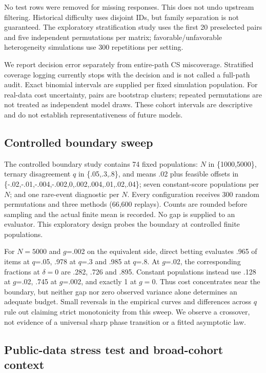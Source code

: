 No test rows were removed for missing responses. This does not undo upstream filtering. Historical difficulty uses disjoint IDs, but family separation is not guaranteed. The exploratory stratification study uses the first 20 preselected pairs and five independent permutations per matrix; favorable/unfavorable heterogeneity simulations use 300 repetitions per setting.

We report decision error separately from entire-path CS miscoverage. Stratified coverage logging currently stops with the decision and is not called a full-path audit. Exact binomial intervals are supplied per fixed simulation population. For real-data cost uncertainty, pairs are bootstrap clusters; repeated permutations are not treated as independent model draws. These cohort intervals are descriptive and do not establish representativeness of future models.

\subsection{Controlled boundary sweep}\label{controlled-boundary-sweep}

The controlled boundary study contains 74 fixed populations: \(N\) in \{1000,5000\}, ternary disagreement \(q\) in \{.05,.3,.8\}, and means .02 plus feasible offsets in \{-.02,-.01,-.004,-.002,0,.002,.004,.01,.02,.04\}; seven constant-score populations per \(N\); and one rare-event diagnostic per \(N\). Every configuration receives 300 random permutations and three methods (66,600 replays). Counts are rounded before sampling and the actual finite mean is recorded. No gap is supplied to an evaluator. This exploratory design probes the boundary at controlled finite populations.

For \(N=5000\) and \(g\)=.002 on the equivalent side, direct betting evaluates .965 of items at \(q\)=.05, .978 at \(q\)=.3 and .985 at \(q\)=.8. At \(g\)=.02, the corresponding fractions at \(\delta=0\) are .282, .726 and .895. Constant populations instead use .128 at \(g\)=.02, .745 at \(g\)=.002, and exactly 1 at \(g=0\). Thus cost concentrates near the boundary, but neither gap nor zero observed variance alone determines an adequate budget. Small reversals in the empirical curves and differences across \(q\) rule out claiming strict monotonicity from this sweep. We observe a crossover, not evidence of a universal sharp phase transition or a fitted asymptotic law.

\subsection{Public-data stress test and broad-cohort context}\label{public-data-stress-test-and-broad-cohort-context}

